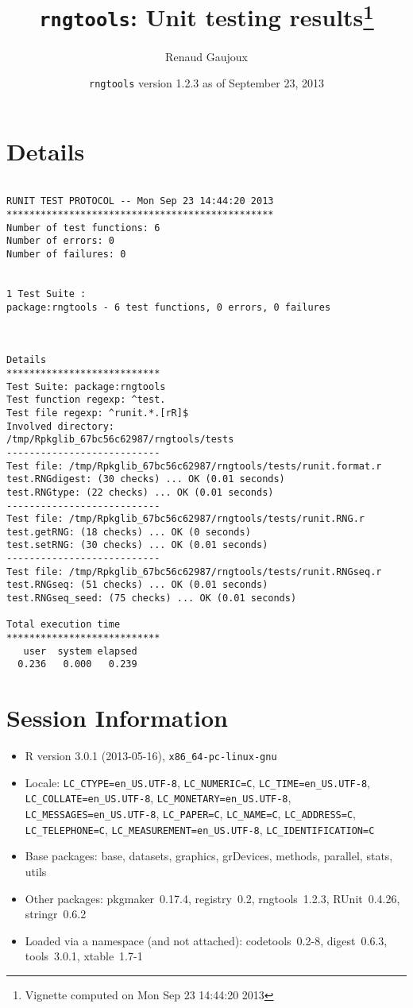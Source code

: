 \documentclass[10pt]{article}\usepackage[]{graphicx}\usepackage[]{color}
\author{Renaud Gaujoux}
\title{\texttt{rngtools}: Unit testing results\footnote{Vignette computed  on Mon Sep 23 14:44:20 2013}}
\date{\texttt{rngtools} version 1.2.3 as of September 23, 2013}
\begin{document}
\maketitle

\section{Details}
\begin{verbatim}

RUNIT TEST PROTOCOL -- Mon Sep 23 14:44:20 2013 
*********************************************** 
Number of test functions: 6 
Number of errors: 0 
Number of failures: 0 

 
1 Test Suite : 
package:rngtools - 6 test functions, 0 errors, 0 failures



Details 
*************************** 
Test Suite: package:rngtools 
Test function regexp: ^test. 
Test file regexp: ^runit.*.[rR]$ 
Involved directory: 
/tmp/Rpkglib_67bc56c62987/rngtools/tests 
--------------------------- 
Test file: /tmp/Rpkglib_67bc56c62987/rngtools/tests/runit.format.r 
test.RNGdigest: (30 checks) ... OK (0.01 seconds)
test.RNGtype: (22 checks) ... OK (0.01 seconds)
--------------------------- 
Test file: /tmp/Rpkglib_67bc56c62987/rngtools/tests/runit.RNG.r 
test.getRNG: (18 checks) ... OK (0 seconds)
test.setRNG: (30 checks) ... OK (0.01 seconds)
--------------------------- 
Test file: /tmp/Rpkglib_67bc56c62987/rngtools/tests/runit.RNGseq.r 
test.RNGseq: (51 checks) ... OK (0.01 seconds)
test.RNGseq_seed: (75 checks) ... OK (0.01 seconds)

Total execution time
***************************
   user  system elapsed 
  0.236   0.000   0.239 

\end{verbatim}

\section*{Session Information}
\begin{itemize}\raggedright
  \item R version 3.0.1 (2013-05-16), \verb|x86_64-pc-linux-gnu|
  \item Locale: \verb|LC_CTYPE=en_US.UTF-8|, \verb|LC_NUMERIC=C|, \verb|LC_TIME=en_US.UTF-8|, \verb|LC_COLLATE=en_US.UTF-8|, \verb|LC_MONETARY=en_US.UTF-8|, \verb|LC_MESSAGES=en_US.UTF-8|, \verb|LC_PAPER=C|, \verb|LC_NAME=C|, \verb|LC_ADDRESS=C|, \verb|LC_TELEPHONE=C|, \verb|LC_MEASUREMENT=en_US.UTF-8|, \verb|LC_IDENTIFICATION=C|
  \item Base packages: base, datasets, graphics, grDevices, methods,
    parallel, stats, utils
  \item Other packages: pkgmaker~0.17.4, registry~0.2, rngtools~1.2.3,
    RUnit~0.4.26, stringr~0.6.2
  \item Loaded via a namespace (and not attached): codetools~0.2-8,
    digest~0.6.3, tools~3.0.1, xtable~1.7-1
\end{itemize}
\end{document}

